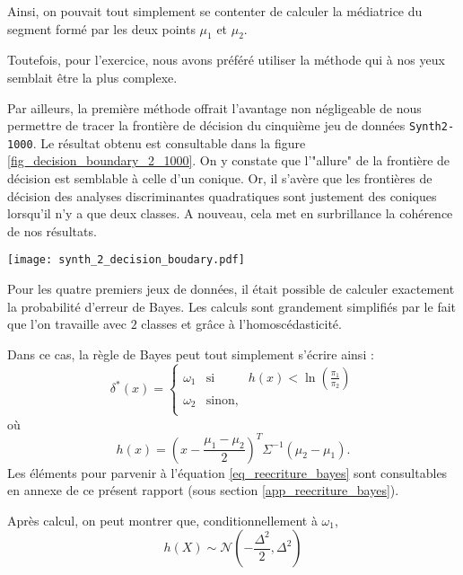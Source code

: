 \documentclass{article}
\begin{document}
\begin{multicols}{2}
Ainsi, on pouvait tout simplement se contenter de calculer la médiatrice du segment formé par les deux points $\mu_1$ et $\mu_2$. 

Toutefois, pour l'exercice, nous avons préféré utiliser la méthode qui à nos yeux semblait être la plus complexe. 

Par ailleurs, la première méthode offrait l'avantage non négligeable de nous permettre de tracer la frontière de décision du cinquième jeu de données \texttt{Synth2-1000}. Le résultat obtenu est consultable dans la figure \ref{fig_decision_boundary_2_1000}. On y constate que l'"allure" de la frontière de décision est semblable à celle d'un conique. Or, il s'avère que les frontières de décision des analyses discriminantes quadratiques sont justement des coniques lorsqu'il n'y a que deux classes. A nouveau, cela met en surbrillance la cohérence de nos résultats.   

\begingroup
   \centering
   \texttt{[image: synth\_2\_decision\_boudary.pdf]}
    \label{fig_decision_boundary_2_1000}
\endgroup

Pour les quatre premiers jeux de données, il était possible de calculer exactement la probabilité d'erreur de Bayes. Les calculs sont grandement simplifiés par le fait que l'on travaille avec $2$ classes et grâce à l'homoscédasticité.

Dans ce cas, la règle de Bayes peut tout simplement s'écrire ainsi :
\begin{equation}
	\label{eq_reecriture_bayes}
  \delta^{\ast}(x) =
  \left\{
    \begin{array}{rcl}
    	\omega_1 & \text{si} & h(x) < \ln(\frac{\pi_1}{\pi_2}) \\ 
        \omega_2 & \text{sinon,} & \\
    \end{array}
  \right.
\end{equation}
où
\[
h(x) = (x -  \frac{\mu_1 - \mu_2}{2})^{T}  \Sigma^{-1} (\mu_2 - \mu_1).
\]
Les éléments pour parvenir à l'équation \ref{eq_reecriture_bayes} sont consultables en annexe de ce présent rapport (sous section \ref{app_reecriture_bayes}).

Après calcul, on peut montrer que, conditionnellement à $\omega_1$,
\begin{equation}
\label{eq_hx_omega_1}
h(X) \sim \mathcal{N}\left( -\frac{\Delta^2}{2}, \Delta^2  \right)
\end{equation}


\end{multicols}
\end{document}
